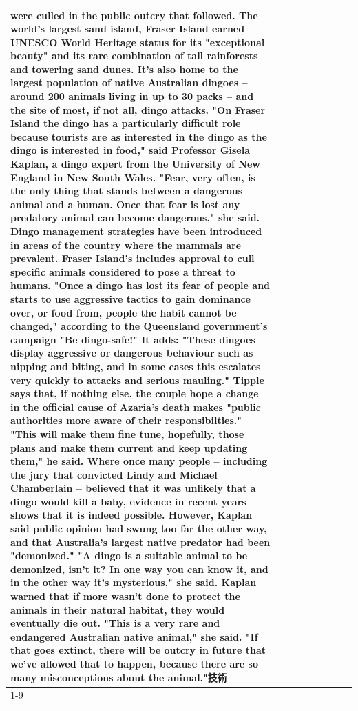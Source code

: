 \begin{table}[H]
\begin{tabular}{lllrlllll}
were culled in the public outcry that followed. The world's largest sand island, Fraser Island earned UNESCO World Heritage status for its "exceptional beauty" and its rare combination of tall rainforests and towering sand dunes. It's also home to the largest population of native Australian dingoes -- around 200 animals living in up to 30 packs -- and the site of most, if not all, dingo attacks. "On Fraser Island the dingo has a particularly difficult role because tourists are as interested in the dingo as the dingo is interested in food," said Professor Gisela Kaplan, a dingo expert from the University of New England in New South Wales. "Fear, very often, is the only thing that stands between a dangerous animal and a human. Once that fear is lost any predatory animal can become dangerous," she said. Dingo management strategies have been introduced in areas of the country where the mammals are prevalent. Fraser Island's includes approval to cull specific animals considered to pose a threat to humans. "Once a dingo has lost its fear of people and starts to use aggressive tactics to gain dominance over, or food from, people the habit cannot be changed," according to the Queensland government's campaign "Be dingo-safe!" It adds: "These dingoes display aggressive or dangerous behaviour such as nipping and biting, and in some cases this escalates very quickly to attacks and serious mauling." Tipple says that, if nothing else, the couple hope a change in the official cause of Azaria's death makes "public authorities more aware of their responsibilties." "This will make them fine tune, hopefully, those plans and make them current and keep updating them," he said. Where once many people -- including the jury that convicted Lindy and Michael Chamberlain -- believed that it was unlikely that a dingo would kill a baby, evidence in recent years shows that it is indeed possible. However, Kaplan said public opinion had swung too far the other way, and that Australia's largest native predator had been "demonized." "A dingo is a suitable animal to be demonized, isn't it? In one way you can know it, and in the other way it's mysterious," she said. Kaplan warned that if more wasn't done to protect the animals in their natural habitat, they would eventually die out. "This is a very rare and endangered Australian native animal," she said. "If that goes extinct, there will be outcry in future that we've allowed that to happen, because there are so many misconceptions about the animal."技術 \\
\cline{1-9}

\end{tabular}
\end{table}
